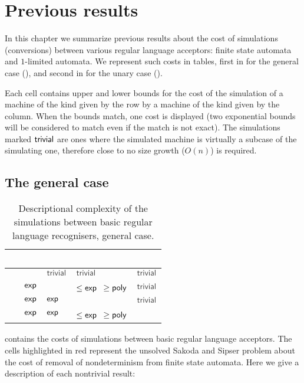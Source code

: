 \chapter{Previous results}
In this chapter we summarize previous results about the cost of simulations (conversions) between various regular language acceptors: finite state automata and $1$-limited automata.
We represent such costs in tables, first in  for the general case (), and second in  for the unary case ().

Each cell contains upper and lower bounds for the cost of the simulation of a machine of the kind given by the row by a machine of the kind given by the column.
When the bounds match, one cost is displayed (two exponential bounds will be considered to match even if the match is not exact).
The simulations marked $\mathsf{trivial}$ are ones where the simulated machine is virtually a subcase of the simulating one, therefore close to no size growth ($O(n)$) is required.



\section{The general case}\label{sec:prevsims-general}

\begin{table}
	\centering
	\renewcommand{\hstdef}{.35}
	\begin{tabular}{|l|l|l|p{2.9em}|l|}
		\hline
		~     & \ODFA   & \ONFA     & \TDFA                          & \TNFA     \\ \hline
		\ODFA & \cY     & $\Cctriv$ & $\Cctriv$                      & $\Cctriv$ \\ \hline
		\ONFA & $\mathsf{exp}$ & \cY       & \cR $\le\Cexp\hst$ $\ge\mathsf{poly}$ & $\Cctriv$ \\ \hline
		\TDFA & $\mathsf{exp}$ & $\mathsf{exp}$   & \cY                            & $\Cctriv$ \\ \hline
		\TNFA & $\mathsf{exp}$ & $\mathsf{exp}$   & \cR $\le\Cexp\hst$ $\ge\mathsf{poly}$ & \cY       \\ \hline
	\end{tabular}
	\caption{Descriptional complexity of the simulations between basic regular language recognisers, general case.}
	\label{tab:sims-core-general}
\end{table}

 contains the costs of simulations between basic regular language acceptors.
The cells highlighted in red represent the unsolved Sakoda and Sipser problem \cite{SakSip78} about the cost of removal of nondeterminism from finite state automata.
Here we give a description of each nontrivial result:

